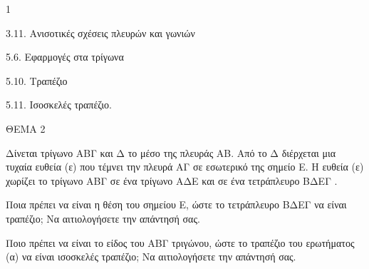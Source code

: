 \begin{ylh}{1}
    \item 3.11. Ανισοτικές σχέσεις πλευρών και γωνιών
    \item 5.6. Εφαρμογές στα τρίγωνα
    \item 5.10. Τραπέζιο
    \item 5.11. Ισοσκελές τραπέζιο.
\end{ylh}

ΘΕΜΑ 2

Δίνεται τρίγωνο ΑΒΓ και Δ το μέσο της πλευράς ΑΒ. Από το Δ διέρχεται μια τυχαία ευθεία (ε) που τέμνει την πλευρά ΑΓ σε εσωτερικό της σημείο Ε. Η ευθεία (ε) χωρίζει το τρίγωνο ΑΒΓ σε ένα τρίγωνο ΑΔΕ και σε ένα τετράπλευρο ΒΔΕΓ .

\begin{alist}
\item Ποια πρέπει να είναι η θέση του σημείου Ε, ώστε το τετράπλευρο ΒΔΕΓ να είναι τραπέζιο; Να αιτιολογήσετε την απάντησή σας. 

\item Ποιο πρέπει να είναι το είδος του ΑΒΓ τριγώνου, ώστε το τραπέζιο του ερωτήματος (α) να είναι ισοσκελές τραπέζιο; Να αιτιολογήσετε την απάντησή σας. 


\begin{center}
\end{center}
\end{alist}
